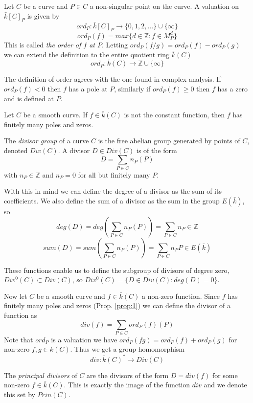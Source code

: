 \begin{mydef}
 Let $C$ be a curve and $P\in C$ a non-singular point on the curve. A valuation on
$\bar{k}[C]_P$ is given by
$$ ord_P : \bar{k}[C]_P \rightarrow \{ 0, 1, 2, \ldots \} \cup \{ \infty \} $$
$$ ord_P(f) = max \{ d\in \mathbb{Z} : f\in M_P^d \} $$
This is called \emph{the order of $f$ at $P$}.
Letting $ord_P(f/g) = ord_P(f) - ord_P(g)$ we can extend the definition to the entire
quotient ring $\bar{k}(C)$
$$ ord_P: \bar{k}(C) \rightarrow \mathbb{Z}\cup \{\infty \} $$
\end{mydef}

The definition of order agrees with the one found in complex analysis.
If $ord_P(f) < 0$ then $f$ has a pole at $P$, similarly if $ord_P(f) \ge 0$ then $f$ 
has a zero and is defined at $P$.

\begin{prop}
 Let $C$ be a smooth curve. If $f\in \bar{k}(C)$ is not the constant function, then
$f$ has finitely many poles and zeros.
\label{prop:1}
\end{prop}

\begin{mydef}
 The \emph{divisor group} of a curve $C$ is the free abelian group generated by
points of $C$, denoted $Div(C)$. A divisor $D\in Div(C)$ is of the form
$$ D = \sum_{P\in C} n_P(P)$$
with $n_P\in\mathbb{Z}$ and $n_P = 0$ for all but finitely many $P$.
\end{mydef}

With this in mind we can define the degree of a divisor as the sum of its 
coefficients. We also define the sum of a divisor as the sum in the group $E(\bar{k})$, so
$$ deg(D) = deg\left(\sum_{P\in C} n_P(P)\right) = \sum_{P\in C} n_P \in \mathbb{Z}$$
$$ sum(D) = sum\left(\sum_{P\in C} n_P(P)\right) = \sum_{P\in C} n_P P \in E(\bar{k})$$

These functions enable us to define the subgroup of divisors of degree zero,
$Div^0(C) \subset Div(C)$, so $Div^0(C) = \{ D\in Div(C) : deg(D) = 0 \}$.

Now let $C$ be a smooth curve and $f\in \bar{k}(C)$ a non-zero function. Since $f$
has finitely many poles and zeros (Prop. \ref{prop:1}) we can define the divisor of a
function as
$$ div(f) = \sum_{P\in C} ord_P(f)(P) $$
Note that $ord_P$ is a valuation we have $ord_P(fg) = ord_P(f)+ord_P(g)$
for non-zero $f,g\in \bar{k}(C)$. Thus we get a group homomorphism
$$ div: \bar{k}(C)^* \rightarrow Div(C)$$

\begin{mydef}
 The \emph{principal divisors} of $C$ are the divisors of the form
$ D = div(f) $ for some non-zero $f\in \bar{k}(C)$. This is exactly
the image of the function $div$ and we denote this set by $Prin(C)$.
\end{mydef}

